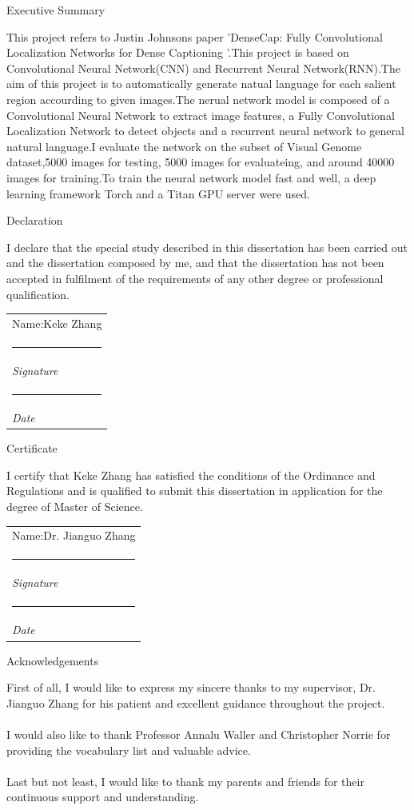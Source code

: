 \documentclass[12pt,a4paper]{report}
\makeatletter
\newcommand{\namesigdate}[2][5cm]{%
  \begin{tabular}{@{}p{#1}@{}}
    #2 \\[2\normalbaselineskip] \hrule \\[0pt]
    {\small \textit{Signature}} \\[2\normalbaselineskip] \hrule \\[0pt]
    {\small \textit{Date}}
  \end{tabular}
}
\makeatother
\begin{document}
\begin{center}
{\huge Executive Summary}
\end{center}
This project refers to Justin Johnson\textsc{}s paper 'DenseCap: Fully Convolutional Localization Networks for Dense Captioning '.This project is based on Convolutional Neural Network(CNN) and Recurrent Neural Network(RNN).The aim of this project is to automatically generate natual language for each salient region accourding to given images.The nerual network model is composed of a Convolutional Neural Network to extract image features, a Fully Convolutional Localization Network to detect objects and a recurrent neural network to general natural language.I evaluate the  network on the subset of Visual Genome dataset,5000 images for testing, 5000 images for evaluateing, and around 40000 images for training.To train the neural network model fast and well, a deep learning framework  Torch and a Titan GPU server were used.
\newpage

\newpage\null\thispagestyle{empty}\newpage
\begin{center}
{\huge Declaration}
\end{center}
I declare that the special study described in this dissertation has been carried out and the dissertation composed by me, and that the dissertation has not been accepted in fulfilment of the requirements of any other degree or professional qualification.\\

\vspace{3cm}

\noindent \namesigdate{Name:Keke Zhang}
\newpage
\newpage\null\thispagestyle{empty}\newpage

\begin{center}
{\huge Certificate}
\end{center}
I certify that Keke Zhang has satisfied the conditions of the Ordinance and Regulations and is qualified to submit this dissertation in application for the degree of Master of Science.


\vspace{3cm}

\noindent \namesigdate{Name:Dr. Jianguo Zhang}
\newpage

\newpage
\newpage\null\thispagestyle{empty}\newpage

\begin{center}
{\huge Acknowledgements}
\end{center}
First of all, I would like to express my sincere thanks to my supervisor, Dr. Jianguo Zhang for his patient and excellent guidance throughout the project.\\
\\
I would also like to thank Professor Annalu Waller and Christopher Norrie for providing the vocabulary list and valuable advice.\\
\\
Last but not least, I would like to thank my parents and friends for their continuous support and understanding.
\end{document}

